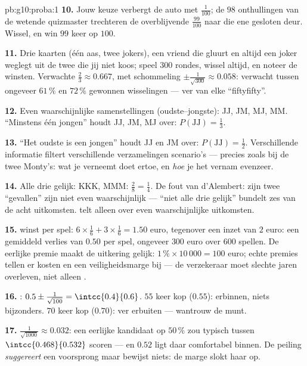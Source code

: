 \begin{solution}{pb:g10:proba:1}
\textbf{10.} Jouw keuze verbergt de auto met  $\frac{1}{100}$; de $98$
onthullingen van de wetende quizmaster trechteren de overblijvende
$\frac{99}{100}$ naar die ene gesloten deur. Wissel, en win $99$ keer op
$100$.

\textbf{11.} Drie kaarten (één aas, twee jokers), een vriend die gluurt en
altijd een joker weglegt uit de twee die jij niet koos; speel $300$ rondes,
wissel altijd, en noteer de winsten. Verwachte 
$\frac23 \approx 0.667$, met schommeling
$\pm\frac{1}{\sqrt{300}} \approx 0.058$: verwacht tussen ongeveer $61\,\%$ en
$72\,\%$ gewonnen wisselingen --- ver van elke ``fiftyfifty''.

\textbf{12.} Even waarschijnlijke samenstellingen (oudste--jongste): JJ, JM,
MJ, MM. ``Minstens één jongen'' houdt JJ, JM, MJ over:
$P(\text{JJ}) = \frac13$.

\textbf{13.} ``Het oudste is een jongen'' houdt JJ en JM over:
$P(\text{JJ}) = \frac12$. Verschillende informatie filtert verschillende
verzamelingen scenario's --- precies zoals bij de twee Monty's: wat je
verneemt doet ertoe, en \emph{hoe} je het vernam evenzeer.

\textbf{14.} Alle drie gelijk: KKK, MMM: $\frac28 = \frac14$. De fout van
d'Alembert: zijn twee ``gevallen'' zijn niet even waarschijnlijk --- ``niet
alle drie gelijk'' bundelt zes van de acht uitkomsten.
 telt alleen over even waarschijnlijke
uitkomsten.

\textbf{15.}  winst per spel:
$6 \times \frac16 + 3 \times \frac16 = 1.50$ euro, tegenover een inzet van
$2$ euro: een gemiddeld verlies van $0.50$ per spel, ongeveer $300$ euro
over $600$ spellen. De eerlijke premie maakt de  uitkering gelijk:
$1\,\% \times 10\,000 = 100$ euro; echte premies tellen er kosten en een
veiligheidsmarge bij --- de verzekeraar moet slechte jaren overleven, niet
alleen .

\textbf{16.} : $0.5 \pm \frac{1}{\sqrt{100}} = \intcc{0.4}{0.6}$.
$55$ keer kop ($0.55$): erbinnen, niets bijzonders. $70$ keer kop ($0.70$):
ver erbuiten --- wantrouw de munt.

\textbf{17.} $\frac{1}{\sqrt{1000}} \approx 0.032$: een eerlijke kandidaat op
$50\,\%$ zou typisch tussen $\intcc{0.468}{0.532}$ scoren --- en $0.52$ ligt
daar comfortabel binnen. De peiling \emph{suggereert} een voorsprong maar
bewijst niets: de marge slokt haar op.


\end{solution}
